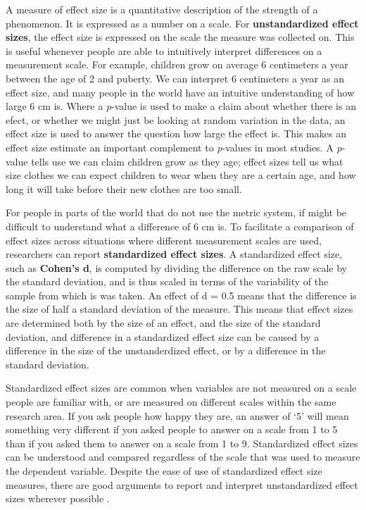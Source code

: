 \documentclass[
]{krantz}
\begin{document}
A measure of effect size is a quantitative description of the strength of a phenomenon. It is expressed as a number on a scale. For \textbf{unstandardized effect sizes}, the effect size is expressed on the scale the measure was collected on. This is useful whenever people are able to intuitively interpret differences on a measurement scale. For example, children grow on average 6 centimeters a year between the age of 2 and puberty. We can interpret 6 centimeters a year as an effect size, and many people in the world have an intuitive understanding of how large 6 cm is. Where a \emph{p}-value is used to make a claim about whether there is an efect, or whether we might just be looking at random variation in the data, an effect size is used to answer the question how large the effect is. This makes an effect size estimate an important complement to \emph{p}-values in most studies. A \emph{p}-value tells use we can claim children grow as they age; effect sizes tell us what size clothes we can expect children to wear when they are a certain age, and how long it will take before their new clothes are too small.

For people in parts of the world that do not use the metric system, if might be difficult to understand what a difference of 6 cm is. To facilitate a comparison of effect sizes across situations where different measurement scales are used, researchers can report \textbf{standardized effect sizes}. A standardized effect size, such as \textbf{Cohen's d}, is computed by dividing the difference on the raw scale by the standard deviation, and is thus scaled in terms of the variability of the sample from which is was taken. An effect of d = 0.5 means that the difference is the size of half a standard deviation of the measure. This means that effect sizes are determined both by the size of an effect, and the size of the standard deviation, and difference in a standardized effect size can be caused by a difference in the size of the unstanderdized effect, or by a difference in the standard deviation.

Standardized effect sizes are common when variables are not measured on a scale people are familiar with, or are measured on different scales within the same research area. If you ask people how happy they are, an answer of `5' will mean something very different if you asked people to answer on a scale from 1 to 5 than if you asked them to answer on a scale from 1 to 9. Standardized effect sizes can be understood and compared regardless of the scale that was used to measure the dependent variable. Despite the ease of use of standardized effect size measures, there are good arguments to report and interpret unstandardized effect sizes wherever possible \citep{baguley_standardized_2009}.
\end{document}
